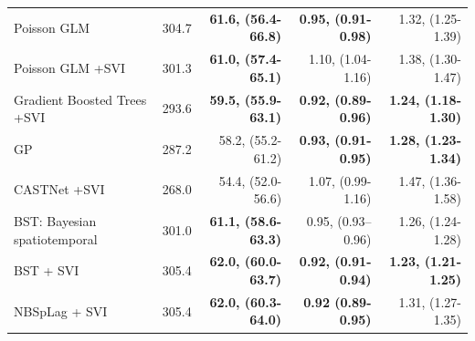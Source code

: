 \begin{table}[htbp]
{\begin{tabular}{@{}>{\hyphenpenalty=10000\exhyphenpenalty=10000\raggedright\arraybackslash}p{1.5in}rrrr@{}}
Poisson GLM & 304.7 & \textbf{61.6, (56.4-66.8)} & \textbf{0.95, (0.91-0.98)} & 1.32, (1.25-1.39) \\
Poisson GLM +SVI & 301.3 & \textbf{61.0, (57.4-65.1)} & 1.10, (1.04-1.16) & 1.38, (1.30-1.47) \\
Gradient Boosted Trees +SVI & 293.6 & \textbf{59.5, (55.9-63.1)} & \textbf{0.92, (0.89-0.96)} & \textbf{1.24, (1.18-1.30)} \\
GP & 287.2 & 58.2, (55.2-61.2) & \textbf{0.93, (0.91-0.95)} & \textbf{1.28, (1.23-1.34)} \\
CASTNet +SVI & 268.0 & 54.4, (52.0-56.6) & 1.07, (0.99-1.16) & 1.47, (1.36-1.58) \\
BST: Bayesian spatiotemporal & 301.0 & \textbf{61.1, (58.6-63.3)} & 0.95, (0.93--0.96) & 1.26, (1.24-1.28) \\
BST + SVI & 305.4 & \textbf{62.0, (60.0-63.7)} & \textbf{0.92, (0.91-0.94)} & \textbf{1.23, (1.21-1.25)} \\
NBSpLag + SVI & 305.4 & \textbf{62.0, (60.3-64.0)} & \textbf{0.92 (0.89-0.95)} & 1.31, (1.27-1.35) \\
\bottomrule
\end{tabular}%
}
\end{table}
